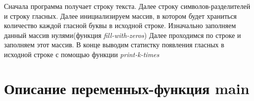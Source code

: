 \documentclass[a4paper,12pt]{report}
\begin{document}
Сначала программа получает строку текста. Далее строку символов-разделителей и строку гласных.
Далее инициализируем массив, в котором будет храниться количество каждой гласной буквы в исходной строке.
Изначально заполняем данный массив нулями(функция \textit{fill-with-zeros})
Далее проходимся по строке и заполняем этот массив.
В конце выводим статистку появления гласных в исходной строке с помощью функции \textit{print-k-times}

\section*{Описание переменных-функция main}
\begin{centering}
\end{centering}

\newpage
\end{document}
